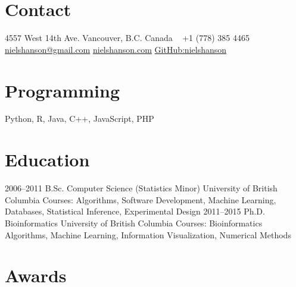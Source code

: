 \documentclass[print]{hanson_cv} %
\begin{document}


\begin{aside} %
\section{Contact}
4557 West 14th Ave.
Vancouver, B.C.
Canada
~
+1 (778) 385 4465
~
\href{mailto:nielshanson@gmail.com}{nielshanson@gmail.com}
\href{http://www.nielshanson.com}{nielshanson.com}
\href{http://www.github.com/nielshanson}{GitHub:nielshanson}
\section{Programming}
Python, R, Java, C++, JavaScript, PHP
\end{aside}


\section{Education}

\begin{entrylist}
\entry
{2006--2011}
{B.Sc. {\normalfont  Computer Science (Statistics Minor)}}
{University of British Columbia}
{Courses: Algorithms, Software Development, Machine Learning, Databases, Statistical Inference, Experimental Design}
\entry
{2011--2015}
{Ph.D. {\normalfont  Bioinformatics}}
{University of British Columbia}
{Courses: Bioinformatics Algorithms, Machine Learning, Information Visualization, Numerical Methods}

\end{entrylist}

\section{Awards}
\end{document}
